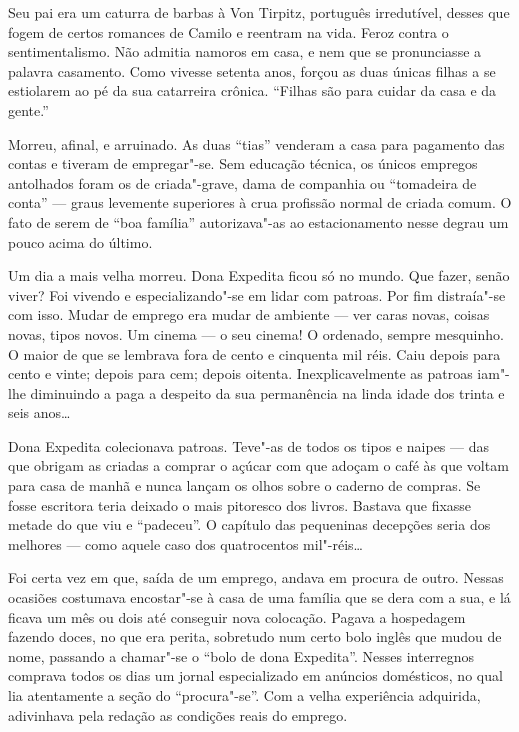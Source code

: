 Seu pai era um caturra de barbas à Von Tirpitz, português irredutível,
desses que fogem de certos romances de Camilo e reentram na vida. Feroz
contra o sentimentalismo. Não admitia namoros em casa, e nem que se
pronunciasse a palavra casamento. Como vivesse setenta anos, forçou as
duas únicas filhas a se estiolarem ao pé da sua catarreira crônica.
``Filhas são para cuidar da casa e da gente.''

Morreu, afinal, e arruinado. As duas ``tias'' venderam a casa para
pagamento das contas e tiveram de empregar"-se. Sem educação técnica, os
únicos empregos antolhados foram os de criada"-grave, dama de companhia
ou ``tomadeira de conta'' --- graus levemente superiores à crua
profissão normal de criada comum. O fato de serem de ``boa família''
autorizava"-as ao estacionamento nesse degrau um pouco acima do último.

Um dia a mais velha morreu. Dona Expedita ficou só no mundo. Que fazer,
senão viver? Foi vivendo e especializando"-se em lidar com patroas. Por
fim distraía"-se com isso. Mudar de emprego era mudar de ambiente --- ver
caras novas, coisas novas, tipos novos. Um cinema --- o seu cinema! O
ordenado, sempre mesquinho. O maior de que se lembrava fora de cento e
cinquenta mil réis. Caiu depois para cento e vinte; depois para cem;
depois oitenta. Inexplicavelmente as patroas iam"-lhe diminuindo a paga a
despeito da sua permanência na linda idade dos trinta e seis anos\ldots{}

Dona Expedita colecionava patroas. Teve"-as de todos os tipos e naipes
--- das que obrigam as criadas a comprar o açúcar com que adoçam o café
às que voltam para casa de manhã e nunca lançam os olhos sobre o caderno
de compras. Se fosse escritora teria deixado o mais pitoresco dos
livros. Bastava que fixasse metade do que viu e ``padeceu''. O capítulo
das pequeninas decepções seria dos melhores --- como aquele caso dos
quatrocentos mil"-réis\ldots{}

Foi certa vez em que, saída de um emprego, andava em procura de outro.
Nessas ocasiões costumava encostar"-se à casa de uma família que se dera
com a sua, e lá ficava um mês ou dois até conseguir nova colocação.
Pagava a hospedagem fazendo doces, no que era perita, sobretudo num
certo bolo inglês que mudou de nome, passando a chamar"-se o ``bolo de
dona Expedita''. Nesses interregnos comprava todos os dias um jornal
especializado em anúncios domésticos, no qual lia atentamente a seção do
``procura"-se''. Com a velha experiência adquirida, adivinhava pela
redação as condições reais do emprego.

